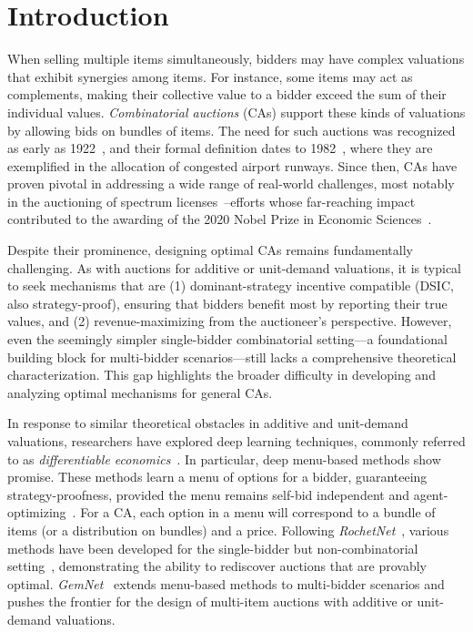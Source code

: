 \section{Introduction}


When selling multiple items simultaneously, bidders may have complex valuations that exhibit synergies among items. For instance, some items may act as complements, making their collective value to a bidder exceed the sum of their individual values. \emph{Combinatorial auctions} (CAs) support these kinds of valuations by allowing bids on bundles of items. The need for such auctions was recognized as early as 1922~\cite{uscongress1925e}, and their formal definition dates to 1982~\cite{rassenti1982combinatorial}, where they are exemplified in the allocation of congested airport runways. Since then, CAs have proven pivotal in addressing a wide range of real-world challenges, most notably in the auctioning of spectrum licenses~\cite{cramton1997fcc,palacios-huerta24}--efforts whose far-reaching impact contributed to the awarding of the 2020 Nobel Prize in Economic Sciences~\cite{NobelPrizeEcon2020}.

Despite their  prominence, designing optimal CAs remains fundamentally challenging. As with auctions for additive or unit-demand valuations, it is typical to seek mechanisms that are (1) dominant-strategy incentive compatible (DSIC, also strategy-proof), ensuring that bidders benefit most by reporting their true values, and (2) revenue-maximizing from the auctioneer's perspective. However, even the seemingly simpler single-bidder combinatorial setting---a foundational building block for multi-bidder scenarios---still lacks a comprehensive theoretical characterization. This gap highlights the broader difficulty in developing and analyzing optimal mechanisms for general CAs.

In response to similar theoretical obstacles in additive and unit-demand valuations, researchers have explored deep learning techniques, commonly referred to as \emph{differentiable economics}~\cite{dutting2024optimal}. In particular, deep menu-based methods show promise. These methods learn a menu of options for a bidder, guaranteeing strategy-proofness, provided the menu remains self-bid independent and agent-optimizing~\citep{hammond1979straightforward}. 
For a CA, each option in a menu will correspond to a bundle of items (or a distribution on bundles) and a price. Following {\em RochetNet}~\cite{dutting2024optimal}, various methods have been developed for the single-bidder but non-combinatorial setting~\cite{curry2022differentiable,duan2023scalable,shen2019automated,dutting2024optimal}, demonstrating
the ability to rediscover auctions that are provably optimal. {\em GemNet}~\cite{wang2024gemnet} extends menu-based methods to multi-bidder scenarios and pushes the frontier for the design of multi-item auctions with additive or unit-demand
valuations. 

